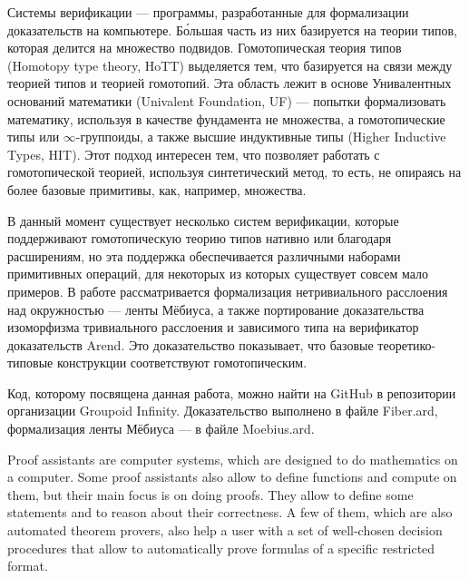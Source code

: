 







\Annot

Системы верификации --- программы, разработанные для формализации доказательств на компьютере. Б\'{о}льшая часть из них базируется на теории типов, которая делится на множество подвидов.
Гомотопическая теория типов (Homotopy type theory, HoTT) выделяется тем, что базируется на связи между теорией типов и теорией гомотопий. Эта область лежит в основе Унивалентных оснований математики (Univalent Foundation, UF) --- попытки формализовать математику, используя в качестве фундамента не множества, а гомотопические типы или $\infty$-группоиды, а также высшие индуктивные типы (Higher Inductive Types, HIT). Этот подход интересен тем, что позволяет работать с гомотопической теорией, используя синтетический метод, то есть, не опираясь на более базовые примитивы, как, например, множества.

В данный момент существует несколько систем верификации, которые поддерживают гомотопическую теорию типов нативно или благодаря расширениям, но эта поддержка обеспечивается различными наборами примитивных операций, для некоторых из которых существует совсем мало примеров.
В работе рассматривается формализация нетривиального расслоения над окружностью --- ленты Мёбиуса, а также портирование доказательства изоморфизма тривиального расслоения и зависимого типа на верификатор доказательств Arend. Это доказательство показывает, что базовые теоретико-типовые конструкции соответствуют гомотопическим.

Код, которому посвящена данная работа, можно найти на GitHub\autocite{Grp1} в репозитории организации Groupoid Infinity. Доказательство выполнено в файле Fiber.ard\autocite{Fiber}, формализация ленты Мёбиуса --- в файле Moebius.ard\autocite{Moebius}.

\Introduction

Proof assistants are computer systems, which are designed to do mathematics on a computer. Some proof assistants also allow to define functions and compute on them, but their main focus is on doing proofs. They allow to define some statements and to reason about their correctness. A few of them, which are also automated theorem provers, also help a user with a set of well-chosen decision procedures that allow to automatically prove formulas of a specific restricted format\autocite{ProofAssistants1}.


